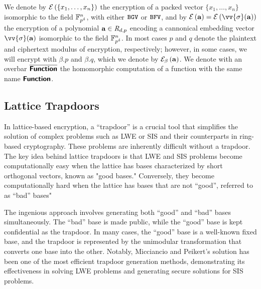 We denote by $\mathcal{E}\left({\{x_1,\ldots,x_n\}}\right)$ the encryption of a packed vector $\{x_1,\ldots,x_n\}$ isomorphic to the field $\mathbb{F}^n_{p^\delta}$, with either $\mathtt{BGV}$ or $\mathtt{BFV}$, and by $\enc{\pa}=\enc{\vv{\sigma}(\pa)}$ the encryption of a polynomial $\mathbf{a} \in \mathit{R}_{d,p}$ encoding a cannonical embedding vector $\vv{\sigma}(\pa)$ isomorphic to the field $\mathbb{F}^n_{p^\delta}$. In most cases $p$ and $q$ denote the plaintext and ciphertext modulus of encryption, respectively; however, in some cases, we will encrypt with $\beta.p$ and $\beta.q$, which we denote by $\mathcal{E}_{\beta}\left({\mathbf{a}}\right)$. We denote with an overbar $\overline{\textsf{\textbf{Function}}}$ the homomorphic computation of a function with the same name $\textsf{\textbf{Function}}$.

\subsection{Lattice Trapdoors}
In lattice-based encryption, a ``trapdoor'' is a crucial tool that simplifies the solution of complex problems such as LWE or SIS and their counterparts in ring-based cryptography. These problems are inherently difficult without a trapdoor. The key idea behind lattice trapdoors is that LWE and SIS problems become computationally easy when the lattice has bases characterized by short orthogonal vectors, known as "good bases." Conversely, they become computationally hard when the lattice has bases that are not ``good'', referred to as ``bad'' bases"

The ingenious approach involves generating both ``good'' and ``bad'' bases simultaneously. The ``bad'' base is made public, while the ``good'' base is kept confidential as the trapdoor. In many cases, the ``good'' base is a well-known fixed base, and the trapdoor is represented by the unimodular transformation that converts one base into the other. Notably, Micciancio and Peikert's \cite{micciancioTrapdoorsLatticesSimpler2012} solution has been one of the most efficient trapdoor generation methods, demonstrating its effectiveness in solving LWE problems and generating secure solutions for SIS problems.

